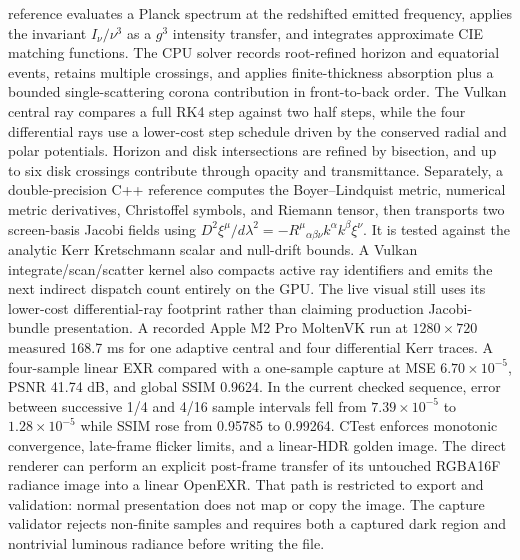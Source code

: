 \documentclass[10pt]{article}
\begin{document}
reference evaluates a Planck spectrum at the redshifted emitted frequency, applies the invariant
$I_\nu/\nu^3$ as a $g^3$ intensity transfer, and integrates approximate CIE matching functions.
The CPU solver records root-refined horizon and equatorial events, retains multiple crossings, and
applies finite-thickness absorption plus a bounded single-scattering corona contribution in
front-to-back order. The Vulkan central ray compares a full RK4 step against two half steps, while
the four differential rays use a lower-cost step schedule driven by the conserved radial and polar
potentials. Horizon and disk intersections are refined by bisection, and up to six disk crossings
contribute through opacity and transmittance. Separately, a double-precision C++ reference computes
the Boyer--Lindquist metric, numerical metric derivatives, Christoffel symbols, and Riemann tensor,
then transports two screen-basis Jacobi fields using
$D^2\xi^\mu/d\lambda^2=-R^\mu{}_{\alpha\beta\nu}k^\alpha k^\beta\xi^\nu$.
It is tested against the analytic Kerr Kretschmann scalar and null-drift bounds. A Vulkan
integrate/scan/scatter kernel also compacts active ray identifiers and emits the next indirect
dispatch count entirely on the GPU. The live visual still uses its lower-cost differential-ray
footprint rather than claiming production Jacobi-bundle presentation. A recorded Apple M2 Pro MoltenVK run at $1280\times720$
measured 168.7 ms for one adaptive central and four differential Kerr traces. A four-sample linear
EXR compared with a one-sample capture at MSE $6.70\times10^{-5}$, PSNR 41.74 dB, and global SSIM
0.9624. In the current checked sequence, error between successive 1/4 and 4/16 sample intervals
fell from $7.39\times10^{-5}$ to $1.28\times10^{-5}$ while SSIM rose from 0.95785 to 0.99264.
CTest enforces monotonic convergence, late-frame flicker limits, and a linear-HDR golden image.
The direct renderer can perform an explicit post-frame transfer of its untouched RGBA16F radiance
image into a linear OpenEXR. That path is restricted to export and validation: normal presentation
does not map or copy the image. The capture validator rejects non-finite samples and requires both a
captured dark region and nontrivial luminous radiance before writing the file.
\end{document}
